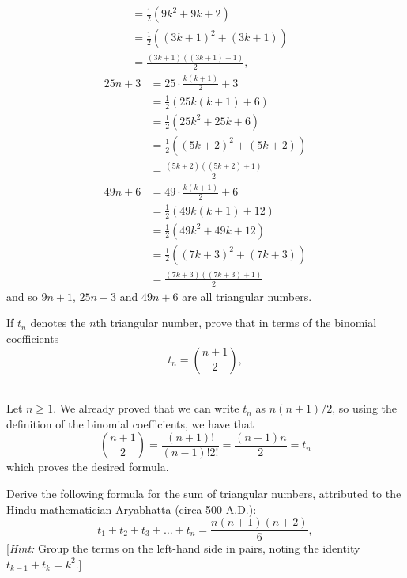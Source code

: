 \begin{solution}
\begin{enumerate}
\begin{align*}
            &= \frac{1}{2}(9k^2 + 9k + 2) \\
            &= \frac{1}{2}((3k+1)^2 + (3k+1)) \\
            &= \frac{(3k+1)((3k+1) + 1)}{2},
        \end{align*}
        \begin{align*}
            25n + 3 &= 25\cdot \frac{k(k+1)}{2} + 3 \\
            &= \frac{1}{2}(25k(k+1) + 6) \\
            &= \frac{1}{2}(25k^2 + 25k + 6) \\
            &= \frac{1}{2}((5k+2)^2 + (5k+2)) \\
            &= \frac{(5k+2)((5k+2) + 1)}{2}
        \end{align*}
        \begin{align*}
            49n + 6 &= 49\cdot \frac{k(k+1)}{2} + 6 \\
            &= \frac{1}{2}(49k(k+1) + 12) \\
            &= \frac{1}{2}(49k^2 + 49k + 12) \\
            &= \frac{1}{2}((7k+3)^2 + (7k+3)) \\
            &= \frac{(7k+3)((7k+3) + 1)}{2}
        \end{align*}
        and so $9n+1$, $25n+3$ and $49n + 6$ are all triangular numbers.
    \end{enumerate}
\end{solution}

\begin{exercise}
    If $t_n$ denotes the $n$th triangular number, prove that in terms of the binomial coefficients
    \begin{equation} \tag*{$n \geq 1.$}
        t_n = \binom{n+1}{2},
    \end{equation}
\end{exercise}

\begin{solution}
    \\ Let $n \geq 1$. We already proved that we can write $t_n$ as $n(n+1)/2$, so using the definition of the binomial coefficients, we have that 
    $$\binom{n+1}{2} = \frac{(n+1)!}{(n-1)! 2!} = \frac{(n+1)n}{2} = t_n$$
    which proves the desired formula.
\end{solution}

\begin{exercise}
    Derive the following formula for the sum of triangular numbers, attributed to the Hindu mathematician Aryabhatta (circa 500 A.D.):
    \begin{equation} \tag*{$n \geq 1.$}
        t_1 + t_2 + t_3 + \dots + t_n = \frac{n(n+1)(n+2)}{6},
    \end{equation}
    [\textit{Hint:} Group the terms on the left-hand side in pairs, noting the identity $t_{k-1} + t_k = k^2$.] \\
\end{exercise}


